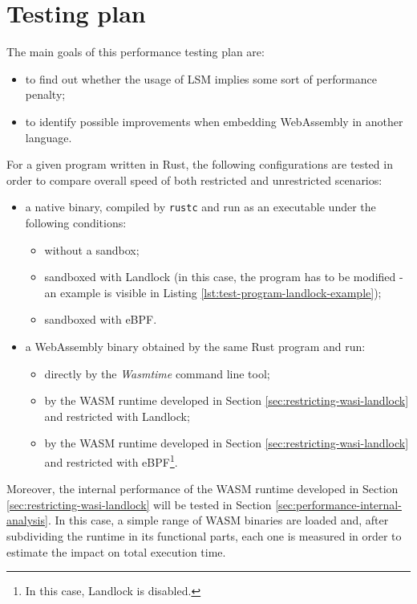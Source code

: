\section{Testing plan}

The main goals of this performance testing plan are:
\begin{itemize}
  \item to find out whether the usage of LSM implies some sort of performance penalty;
  \item to identify possible improvements when embedding WebAssembly in another language.
\end{itemize}

\noindent
For a given program written in Rust, the following configurations are tested in order to compare
overall speed of both restricted and unrestricted scenarios:
\begin{itemize}
  \item a native binary, compiled by \texttt{rustc} and run as an executable under the following conditions:
        \begin{itemize}
          \item without a sandbox;
          \item sandboxed with Landlock (in this case, the program has to be modified - an example is visible in Listing \ref{lst:test-program-landlock-example});
          \item sandboxed with eBPF.
        \end{itemize}
  \item a WebAssembly binary obtained by the same Rust program and run:
        \begin{itemize}
          \item directly by the \textit{Wasmtime} command line tool;
          \item by the WASM runtime developed in Section \ref{sec:restricting-wasi-landlock} and restricted with Landlock;
          \item by the WASM runtime developed in Section \ref{sec:restricting-wasi-landlock} and restricted with
                eBPF\footnote{In this case, Landlock is disabled.}.
        \end{itemize}
\end{itemize}

Moreover, the internal performance of the WASM runtime developed in Section \ref{sec:restricting-wasi-landlock}
will be tested in Section \ref{sec:performance-internal-analysis}. In this case, a simple range of WASM binaries
are loaded and, after subdividing the runtime in its functional parts, each one is measured in order
to estimate the impact on total execution time.


